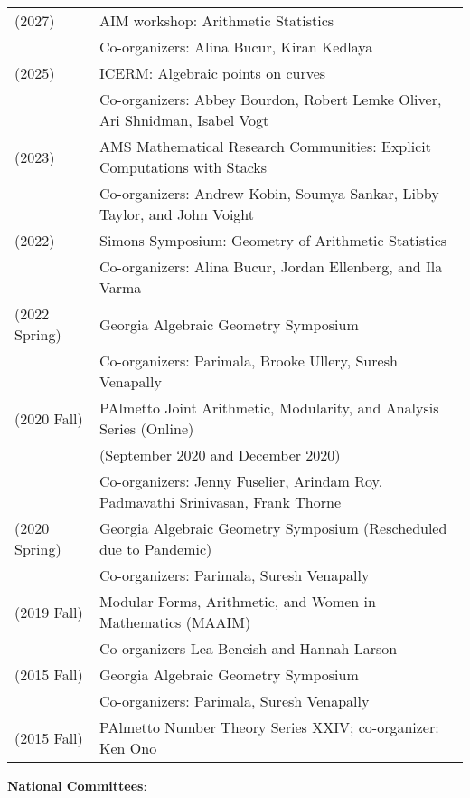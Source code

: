 \documentclass[margin,line]{res}
\newcommand{\defi}[1]{\textsf{#1}} 				%
\begin{document}
\begin{resume}
  \begin{tabular}{ll}
    (2027) & \defi{AIM workshop: Arithmetic Statistics} \\
           & Co-organizers: Alina Bucur, Kiran Kedlaya \\
    (2025) & \defi{ICERM: Algebraic points on curves} \\
           & Co-organizers: Abbey Bourdon, Robert Lemke Oliver, Ari Shnidman, Isabel Vogt \\
    (2023) & \defi{AMS Mathematical Research Communities: Explicit Computations with Stacks} \\
           & Co-organizers: Andrew Kobin, Soumya Sankar, Libby Taylor, and John Voight \\
  (2022) & \defi{Simons Symposium: Geometry of Arithmetic Statistics} \\
  & Co-organizers: Alina Bucur, Jordan Ellenberg, and Ila Varma \\    
  (2022 Spring) & \defi{Georgia Algebraic Geometry Symposium}\\
               & Co-organizers: Parimala, Brooke Ullery, Suresh Venapally   \\
  (2020 Fall) & \defi{PAlmetto Joint Arithmetic, Modularity, and Analysis Series} (Online)\\
               & (September 2020 and December 2020)\\
               & Co-organizers: Jenny Fuselier, Arindam Roy, Padmavathi Srinivasan, Frank Thorne \\
  (2020 Spring) & \defi{Georgia Algebraic Geometry Symposium} (Rescheduled due to Pandemic) \\
               & Co-organizers: Parimala, Suresh Venapally   \\
  (2019 Fall) & \defi{Modular Forms, Arithmetic, and Women in Mathematics} (MAAIM) \\
               & Co-organizers Lea Beneish and Hannah Larson \\  
  (2015 Fall) & \defi{Georgia Algebraic Geometry Symposium} \\
               &  Co-organizers: Parimala, Suresh Venapally   \\
 (2015 Fall) & \defi{PAlmetto Number Theory Series XXIV}; co-organizer: Ken Ono  \\
\end{tabular}

\textbf{National Committees}: 
  \vspace*{-.15in}
  

\end{resume}
\end{document}
